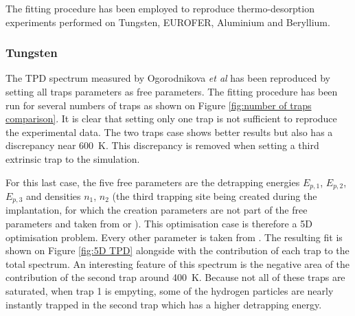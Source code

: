 

The fitting procedure has been employed to reproduce thermo-desorption experiments performed on Tungsten, EUROFER, Aluminium and Beryllium.


\subsubsection{Tungsten}

The TPD spectrum measured by Ogorodnikova \textit{et al}  has been reproduced by setting all traps parameters as free parameters.
The fitting procedure has been run for several numbers of traps as shown on Figure \ref{fig:number of traps comparison}.
It is clear that setting only one trap is not sufficient to reproduce the experimental data.
The two traps case shows better results but also has a discrepancy near \SI{600}{K}.
This discrepancy is removed when setting a third extrinsic trap to the simulation.

For this last case, the five free parameters are the detrapping energies $E_{p, 1}$, $E_{p, 2}$, $E_{p, 3}$ and densities $n_1$, $n_2$ (the third trapping site being created during the implantation, for which the creation parameters are not part of the free parameters and taken from \cite{ogorodnikova_deuterium_2003} or ).
This optimisation case is therefore a 5D optimisation problem.
Every other parameter is taken from \cite{hodille_macroscopic_2015}.
The resulting fit is shown on Figure \ref{fig:5D TPD} alongside with the contribution of each trap to the total spectrum.
An interesting feature of this spectrum is the negative area of the contribution of the second trap around \SI{400}{K}.
Because not all of these traps are saturated, when trap 1 is empyting, some of the hydrogen particles are nearly instantly trapped in the second trap which has a higher detrapping energy.

